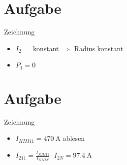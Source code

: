 \documentclass[10pt,a4paper]{article}
\begin{document}
\section{Aufgabe}
Zeichnung
\begin{itemize}
\item $I_2 =$ konstant $\Rightarrow$ Radius konstant
\item $P_1 = 0$
\end{itemize}

\section{Aufgabe}
Zeichnung
\begin{itemize}
\item $I_{KIII11} = \SI{470}{\ampere}$ ablesen
\item $I_{211} = \frac{I_{KIII11}}{I_{KIIIN}}\cdot I_{2N} = \SI{97.4}{\ampere}$
\end{itemize}
\end{document}
